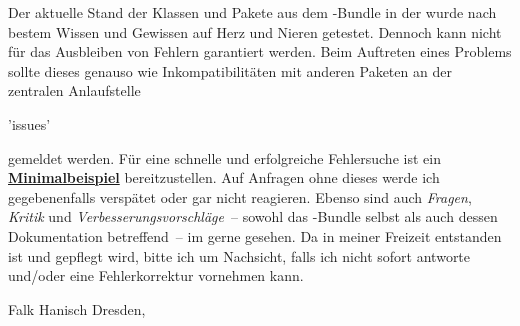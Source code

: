 Der aktuelle Stand der Klassen und Pakete aus dem \TUDScript-Bundle in der 
 wurde nach bestem Wissen und Gewissen auf Herz und Nieren 
getestet. Dennoch kann nicht für das Ausbleiben von Fehlern garantiert werden. 
Beim Auftreten eines Problems sollte dieses genauso wie Inkompatibilitäten mit 
anderen Paketen an der zentralen Anlaufstelle
\begin{quoting}
\renewcommand*\href[2]{\url{#1}\quad(#2)}
\GitHubRepo'issues'%
\end{quoting}
gemeldet werden. Für eine schnelle und erfolgreiche Fehlersuche ist ein 
\href{http://www.komascript.de/minimalbeispiel}{\textbf{Minimalbeispiel}} 
bereitzustellen. Auf Anfragen ohne dieses werde ich gegebenenfalls verspätet 
oder gar nicht reagieren. Ebenso sind auch \emph{Fragen}, \emph{Kritik} und 
\emph{Verbesserungsvorschläge}~-- sowohl das \TUDScript-Bundle selbst als auch 
dessen Dokumentation betreffend~-- im \GitHubRepo gerne gesehen. Da \TUDScript 
in meiner Freizeit entstanden ist und gepflegt wird, bitte ich um Nachsicht, 
falls ich nicht sofort antworte und/oder eine Fehlerkorrektur vornehmen kann.

\bigskip\bigskip
\noindent Falk Hanisch\newline
Dresden, 
